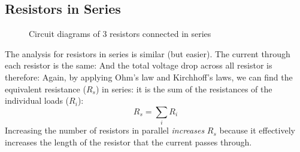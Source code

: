 %
%    
%
%    
%    
%
%  
%
%
%
%
\subsection{Resistors in Series}
\begin{figure}[ht]
  \centering
  \caption{Circuit diagrams of 3 resistors connected in series}
\end{figure}
The analysis for resistors in series is similar (but easier). The current
through each resistor is the same:
And the total voltage drop across all resistor is therefore:
%
%
%
%
Again, by applying Ohm's law and Kirchhoff's laws, we can find the equivalent
resistance ($R_s$) in series: it is the sum of the resistances of the
individual loads ($R_i$):
\begin{equation}
  \boxed{R_s=\sum_iR_i}
\end{equation}
Increasing the number of resistors in parallel \emph{increases} $R_s$ because
it effectively increases the length of the resistor that the current passes
through.
%
%
%
